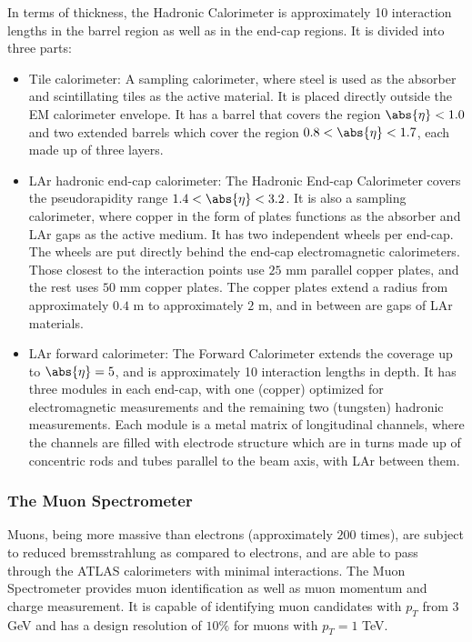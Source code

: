 In terms of thickness, the Hadronic Calorimeter is approximately 10 interaction
lengths in the barrel region as well as in the end-cap regions. It is divided
into three parts:

\begin{itemize}

	\item Tile calorimeter: A sampling calorimeter, where steel is used as the
	      absorber and scintillating tiles as the active material. It is placed directly
	      outside the EM calorimeter envelope. It has a barrel that covers the region
	      $\abs{\eta} < 1.0$ and two extended barrels which cover the region $0.8 <
		      \abs{\eta} < 1.7$, each made up of three layers.


	\item LAr hadronic end-cap calorimeter: The Hadronic End-cap Calorimeter covers
	      the pseudorapidity range $1.4 < \abs{\eta} < 3.2$. It is also a sampling
	      calorimeter, where copper in the form of plates functions as the absorber and
	      LAr gaps as the active medium. It has two independent wheels per end-cap. The
	      wheels are put directly behind the end-cap electromagnetic calorimeters. Those
	      closest to the interaction points use $25$ mm parallel copper plates, and the
	      rest uses $50$ mm copper plates. The copper plates extend a radius from
	      approximately $0.4$ m to approximately $2$ m, and in between are gaps of LAr
	      materials.

	\item LAr forward calorimeter: The Forward Calorimeter extends the coverage up
	      to $\abs{\eta}=5$, and is approximately 10 interaction lengths in depth. It has
	      three modules in each end-cap, with one (copper) optimized for electromagnetic
	      measurements and the remaining two (tungsten) hadronic measurements. Each
	      module is a metal matrix of longitudinal channels, where the channels are
	      filled with electrode structure which are in turns made up of concentric rods
	      and tubes parallel to the beam axis, with LAr between them.

\end{itemize}

\subsubsection{The Muon Spectrometer}\label{s:decmuons}

Muons, being more massive than electrons (approximately $200$ times), are
subject to reduced bremsstrahlung as compared to electrons, and are able to
pass through the ATLAS calorimeters with minimal interactions. The Muon
Spectrometer \cite{lhcaccexp} provides muon identification as well as muon
momentum and charge measurement. It is capable of identifying muon candidates
with $p_T$ from $3$ GeV and has a design resolution of $10\%$ for muons with
$p_T = 1$ TeV.

